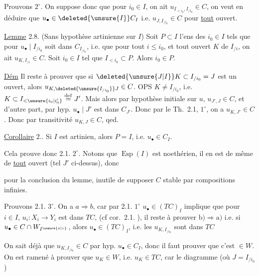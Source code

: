 
Prouvons $2^\circ$. On suppose donc que pour  $i_0\in I$, on ait $u_{I_{<i_0},I_{/i_0}}\in C$, on veut en déduire que $u_\bullet\in\deleted{\unsure{I}}C_I$ i.e. $u_{J,I_{/i_0}}\in C$ pour \uline{tout} ouvert. 

\uline{Lemme} 2.8. (Sans hypothèse artinienne sur $I$) Soit $P\subset I$ l'ens des $i_0\in I$ tels que pour  $u_\bullet\mid I_{/i_0}$ soit dans $C_{I_{/i_0}}$, i.e. que pour tout $i\le i_0$, et tout ouvert $K$ de $I_{/i}$, on ait $u_{K,I_{/i}}\in C$.  Soit $i_0\in I$ tel que $I_{<i_0}\subset P$. Alors $i_0\in P$.

\uline{Dém} Il reste à prouver que si $\deleted{\unsure{J|I}}K\subset I_{/i_0}=J$ est un ouvert, alors $u_{K,\deleted{\unsure{I_{/i_0}}}J}\in C$. OPS $K\ne I_{/i_0}$, i.e. $K\subset I_{<\unsure{i_0|i'_0}}\overset{\mathrm{def}}{=}J'$. Mais alors par hypothèse initiale sur $u$,  $u_{J',J}\in C$, et d'autre part,  par hyp. $u_\bullet\mid J'$ est dans $C_{J'}$. Donc par le Th.\ 2.1, $1^\circ$, on a $u_{K,J'}\in C$. Donc par transitivité $u_{K,J}\in C$, qed.

\uline{Corollaire} 2.. Si $I$ est artinien, alors $P=I$, i.e. $u_\bullet\in C_I$.

Cela prouve donc 2.1. $2^\circ$. Notons que $\operatorname{Esp}(I)$ est noethérien, il en est de même de \uline{tout} ouvert (tel $J'$ ci-dessus), donc



pour la conclusion du lemme, inutile de supposer $C$ stable par compositions infinies.

Prouvons 2.1. $3^\circ$. On a $a\Longrightarrow b$, car par 2.1. $1^\circ$\unsure{,|)} $u_\bullet\in(TC)_I$ implique que pour $i\in I$, $u_i:X_i\longrightarrow Y_i$ est dans $TC$,  (cf cor.\ 2.1. ),  il reste à prouver $\mathrm{b)}\Longrightarrow\mathrm{a)}$ i.e. si $u_\bullet\in C\cap W_{I^{\unsure{o|\circ}}}$, alors $u_\bullet\in(TC)_I$, i.e. les $u_{K,I_{/i_0}}$ sont dans $TC$ 

On sait déjà que $u_{K,I_{/i_0}}\in C$ par hyp. $u_\bullet\in C_I$, donc il faut prouver que c'est $\in W$. On est ramené à prouver que $u_K\in W$, i.e. $u_K\in TC$, car  le diagramme (où $J=I_{/i_0}$)

